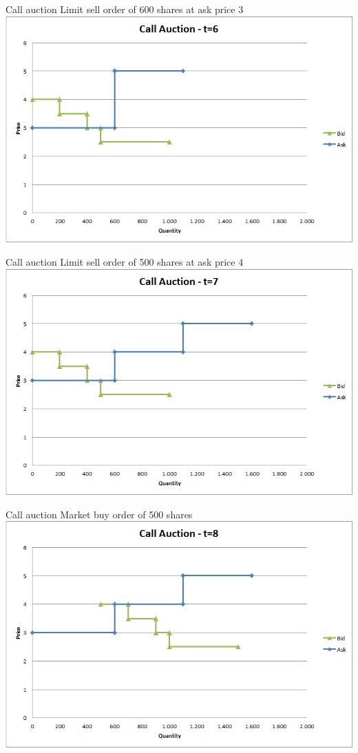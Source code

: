 \documentclass[english,10pt
,aspectratio=169
]{beamer}
\begin{document}
\begin{frame}{Call auction}
	Limit sell order of 600 shares at ask price 3
	\quad
	\center
	\includegraphics[width=.75\linewidth]{pics/ch1/Call_t6}
\end{frame}


\begin{frame}{Call auction}
	Limit sell order of 500 shares at ask price 4
	\quad
	\center
	\includegraphics[width=.75\linewidth]{pics/ch1/Call_t7}
\end{frame}


\begin{frame}{Call auction}
	Market buy order of 500 shares
	\quad
	\center
	\includegraphics[width=.75\linewidth]{pics/ch1/Call_t8}
\end{frame}
\end{document}
